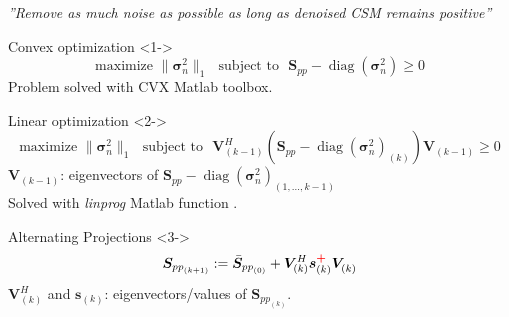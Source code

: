 \documentclass[8pt,xcolor=x11names,compress, notes=show]{beamer}%
\newcommand{\diag}[1]{\operatorname{diag}\left(#1\right)}
\newcommand{\citeTransp}[1]{\color{fg!50} \citep{#1}}
\begin{document}
\begin{frame}{\insertsectionhead}	
\textit{''Remove as much noise as possible as long as denoised CSM remains positive''}
	\begin{block}{Convex optimization   \citeTransp{Hald2017}}<1->
		\begin{equation*}
        			\text{maximize~} \| \bm{\sigma}_{n}^2\|_1 \text{~~subject to~~} \bm{S}_{pp}- \diag{\bm{\sigma}_n^2} \geq 0
		\end{equation*}
		Problem solved with CVX Matlab toolbox.
	\end{block}
	\begin{block}{Linear optimization \citeTransp{dougherty2016}}<2->
		\vspace{-0.2cm}
		\begin{equation*}
			\text{maximize~} \| \bm{\sigma}_{n}^2\|_1   \text{~~subject to~~}  \bm{V}^{H}_{(k-1)} \left( \bm{S}_{pp}- \diag{\bm{\sigma}_n^2}_{(k)} \right) \bm{V}_{(k-1)} \geq 0 
		\end{equation*}
		 $\bm{V}_{(k-1)}$: eigenvectors of $\bm{S}_{pp}-\diag{\bm{\sigma}_n^2}_{(1,...,k-1)} $\\[1pt]
		Solved with \textit{linprog} Matlab function .
	\end{block}
	\begin{block}{Alternating Projections  \citeTransp{leclere:hal-01279944}}<3->
		\begin{equation*}
        			 \bm{S}_{{pp}_{(k+1)}} := \bar{\bm{S}}_{{pp}_{(0)}} + \bm{V}^{H}_{(k)} \bm{s}_{(k)}^{\textcolor{red}{\textbf{+}}}\bm{V}^{~}_{(k)}
		\end{equation*}
		$\bm{V}^{H}_{(k)}$ and $\bm{s}_{(k)}$: eigenvectors/values of  $\bm{S}_{{pp}_{(k)}}$.\\[1pt]
	\end{block}	
\end{frame}

\end{document}
